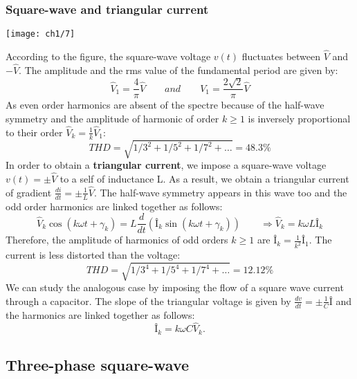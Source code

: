 		\subsubsection{Square-wave and triangular current}
			\begin{center}
			\texttt{[image: ch1/7]}
			\end{center}
			According to the figure, the square-wave voltage $v(t)$ fluctuates between $\hat{V}$ and $-\hat{V}$. The amplitude and the rms value of the fundamental period are given by: 
			\begin{equation}
				\hat{V}_1 = \frac{4}{\pi}\hat{V} \qquad and \qquad V_1 = \frac{2\sqrt{2}}{\pi} \hat{V}
			\end{equation}
			As even order harmonics are absent of the spectre because of the half-wave symmetry and the amplitude of harmonic of order $k\geq 1$ is inversely proportional to their order $\hat{V}_k = \frac{1}{k}\hat{V}_1$: 
		   	\begin{equation}
		   		THD = \sqrt{1/3^2 + 1/5^2+1/7^2+ \dots} = 48.3\%
		   	\end{equation}
			In order to obtain a \textbf{triangular current}, we impose a square-wave voltage $v(t) = \pm \hat{V}$ to a self of inductance L. As a result, we obtain a triangular current of gradient $\frac{di}{dt}= \pm \frac{1}{L}\hat{V}$. The half-wave symmetry appears in this wave too and the odd order harmonics are linked together as follows:
		   	\begin{equation}
		   		\hat{V}_k \cos (k\omega t+ \gamma _k) = L\frac{d}{dt}\left( Î_k \sin (k\omega t+ \gamma _k)\right)\qquad \Rightarrow  \hat{V}_k = k\omega L Î_k
			\end{equation}		  
			Therefore, the amplitude of harmonics of odd orders $k\geq 1$ are $Î_k = \frac{1}{k^2}Î_1$. The current is less distorted than the voltage:
			\begin{equation}
				THD = \sqrt{1/3^4+1/5^4+1/7^4+\dots} = 12.12\%
			\end{equation}
			We can study the analogous case by imposing the flow of a square wave current through a capacitor. The slope of the triangular voltage is given by $\frac{dv}{dt} = \pm \frac{1}{C}Î$ and the harmonics are linked together as follows: 
		   	\begin{equation}
		   		Î_k = k\omega C \hat{V}_k.
		   	\end{equation}
		   	
	\subsection{Three-phase square-wave}
